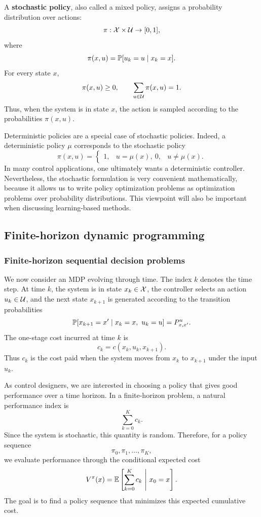 A \textbf{stochastic policy}, also called a mixed policy, assigns a probability distribution over actions:
\[
\pi:\mathcal{X} \times \mathcal{U} \to [0,1],
\]
where
\[
\pi(x,u) = \mathbb{P}[u_k=u \mid x_k=x].
\]
For every state \(x\),
\[
\pi(x,u)\ge 0,
\qquad
\sum_{u\in\mathcal{U}}\pi(x,u)=1.
\]
Thus, when the system is in state \(x\), the action is sampled according to the probabilities
\(\pi(x,u)\).

Deterministic policies are a special case of stochastic policies. Indeed, a deterministic policy
\(\mu\) corresponds to the stochastic policy
\[
\pi(x,u)
=
\begin{cases}
1, & u=\mu(x),\
0, & u\neq \mu(x).
\end{cases}
\]
In many control applications, one ultimately wants a deterministic controller. Nevertheless, the
stochastic formulation is very convenient mathematically, because it allows us to write policy
optimization problems as optimization problems over probability distributions. This viewpoint
will also be important when discussing learning-based methods.

\subsection{Finite-horizon dynamic programming}
\subsubsection{Finite-horizon sequential decision problems}

We now consider an MDP evolving through time. The index \(k\) denotes the time step. At time
\(k\), the system is in state \(x_k\in\mathcal{X}\), the controller selects an action \(u_k\in\mathcal{U}\), and
the next state \(x_{k+1}\) is generated according to the transition probabilities
\[
\mathbb{P}[x_{k+1}=x' \mid x_k=x,\ u_k=u] = P^u_{x,x'}.
\]
The one-stage cost incurred at time \(k\) is
\[
c_k = c(x_k,u_k,x_{k+1}).
\]
Thus \(c_k\) is the cost paid when the system moves from \(x_k\) to \(x_{k+1}\) under the
input \(u_k\).

As control designers, we are interested in choosing a policy that gives good performance over a
time horizon. In a finite-horizon problem, a natural performance index is
\[
\sum_{k=0}^{K} c_k.
\]
Since the system is stochastic, this quantity is random. Therefore, for a policy sequence
\[
\pi_0,\pi_1,\dots,\pi_K,
\]
we evaluate performance through the conditional expected cost
\[
V^\pi(x)
=
\mathbb{E}\left[
\sum_{k=0}^{K} c_k
\ \middle|\ x_0=x
\right].
\]
The goal is to find a policy sequence that minimizes this expected cumulative cost.

